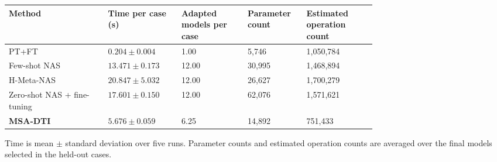 \begin{center}
\begin{minipage}{\linewidth}
\label{tab:target-cost}
\centering
\scriptsize
\renewcommand{\arraystretch}{1.07}
\setlength{\tabcolsep}{2.8pt}
\begin{tabularx}{\linewidth}
{Y Z{0.20\linewidth} Z{0.18\linewidth} Z{0.16\linewidth} Z{0.19\linewidth}}
\toprule
Method
& Time per case (s)
& Adapted models per case
& Parameter count
& Estimated operation count \\
\midrule
PT+FT
& $0.204\pm0.004$
& 1.00
& 5{,}746
& 1{,}050{,}784 \\
Few-shot NAS
& $13.471\pm0.173$
& 12.00
& 30{,}995
& 1{,}468{,}894 \\
H-Meta-NAS
& $20.847\pm5.032$
& 12.00
& 26{,}627
& 1{,}700{,}279 \\
Zero-shot NAS + fine-tuning
& $17.601\pm0.150$
& 12.00
& 62{,}076
& 1{,}571{,}621 \\
\textbf{MSA-DTI}
& $5.676\pm0.059$
& 6.25
& 14{,}892
& 751{,}433 \\
\bottomrule
\end{tabularx}
\vspace{2pt}
\par\footnotesize
Time is mean $\pm$ standard deviation over five runs. Parameter
counts and estimated operation counts are averaged over the final models
selected in the held-out cases.
\end{minipage}
\end{center}
